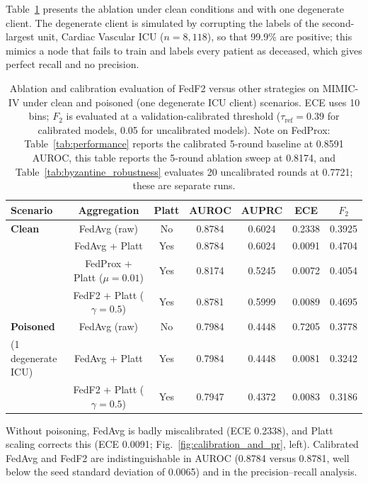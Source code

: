 \documentclass[journal]{IEEEtran}
\begin{document}
Table~\ref{tab:clinical_aggregation} presents the ablation under clean conditions and with one degenerate client. The degenerate client is simulated by corrupting the labels of the second-largest unit, Cardiac Vascular ICU ($n=8{,}118$), so that 99.9\% are positive; this mimics a node that fails to train and labels every patient as deceased, which gives perfect recall and no precision.

\begin{table}[t]
\caption{Ablation and calibration evaluation of FedF2 versus other strategies on MIMIC-IV under clean and poisoned (one degenerate ICU client) scenarios. ECE uses 10 bins; $F_2$ is evaluated at a validation-calibrated threshold ($\tau_{\text{ref}}=0.39$ for calibrated models, 0.05 for uncalibrated models). Note on FedProx: Table~\ref{tab:performance} reports the calibrated 5-round baseline at 0.8591 AUROC, this table reports the 5-round ablation sweep at 0.8174, and Table~\ref{tab:byzantine_robustness} evaluates 20 uncalibrated rounds at 0.7721; these are separate runs.}
\centering
\small
\begin{tabular}{lcccccc}
\toprule
\textbf{Scenario} & \textbf{Aggregation} & \textbf{Platt} & \textbf{AUROC} & \textbf{AUPRC} & \textbf{ECE} & \textbf{$F_2$} \\
\midrule
\textbf{Clean} & FedAvg (raw) & No & 0.8784 & 0.6024 & 0.2338 & 0.3925 \\
 & FedAvg + Platt & Yes & 0.8784 & 0.6024 & 0.0091 & 0.4704 \\
 & FedProx + Platt ($\mu = 0.01$) & Yes & 0.8174 & 0.5245 & 0.0072 & 0.4054 \\
 & FedF2 + Platt ($\gamma = 0.5$) & Yes & 0.8781 & 0.5999 & 0.0089 & 0.4695 \\
\midrule
\textbf{Poisoned} & FedAvg (raw) & No & 0.7984 & 0.4448 & 0.7205 & 0.3778 \\
(1 degenerate ICU) & FedAvg + Platt & Yes & 0.7984 & 0.4448 & 0.0081 & 0.3242 \\
 & FedF2 + Platt ($\gamma = 0.5$) & Yes & 0.7947 & 0.4372 & 0.0083 & 0.3186 \\
\bottomrule
\end{tabular}
\label{tab:clinical_aggregation}
\end{table}

Without poisoning, FedAvg is badly miscalibrated (ECE 0.2338), and Platt scaling corrects this (ECE 0.0091; Fig.~\ref{fig:calibration_and_pr}, left). Calibrated FedAvg and FedF2 are indistinguishable in AUROC (0.8784 versus 0.8781, well below the seed standard deviation of 0.0065) and in the precision--recall analysis.
\end{document}
